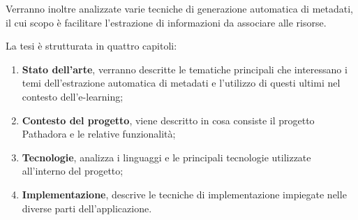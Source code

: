 \vspace{5mm}

Verranno inoltre analizzate varie tecniche di generazione automatica di metadati, il cui scopo è facilitare l'estrazione di informazioni da associare alle risorse.

\vspace{5mm}

La tesi è strutturata in quattro capitoli:
\begin{enumerate}
\item \textbf{Stato dell'arte}, verranno descritte le tematiche principali che interessano i temi dell'estrazione automatica di metadati e l'utilizzo di questi ultimi nel contesto dell'e-learning;
\item \textbf{Contesto del progetto}, viene descritto in cosa consiste il progetto Pathadora e le relative funzionalità;
\item \textbf{Tecnologie}, analizza i linguaggi e le principali tecnologie utilizzate all’interno del progetto;
\item \textbf{Implementazione}, descrive le tecniche di implementazione impiegate nelle diverse parti dell’applicazione.
\end{enumerate}

\clearpage{\pagestyle{empty}\cleardoublepage}